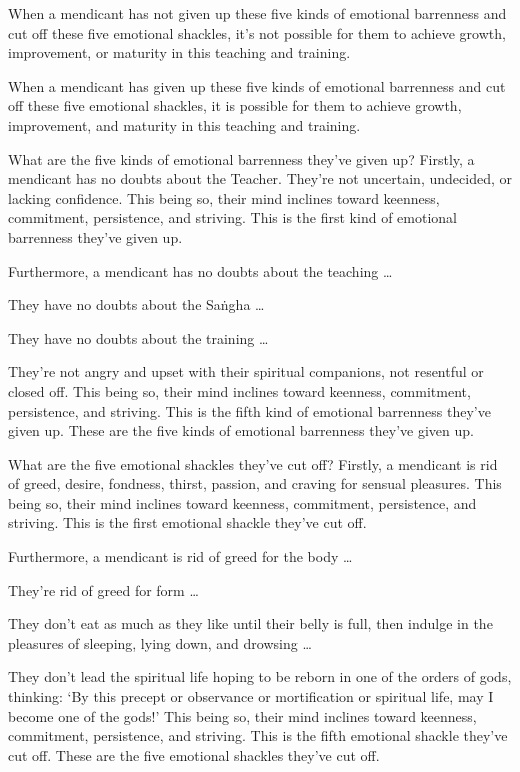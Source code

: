 \documentclass[12pt,openany]{book}%
\begin{document}
When a mendicant has not given up these five kinds of emotional barrenness and cut off these five emotional shackles, it’s not possible for them to achieve growth, improvement, or maturity in this teaching and training. 

When a mendicant has given up these five kinds of emotional barrenness and cut off these five emotional shackles, it is possible for them to achieve growth, improvement, and maturity in this teaching and training. 

What are the five kinds of emotional barrenness they’ve given up? Firstly, a mendicant has no doubts about the Teacher. They’re not uncertain, undecided, or lacking confidence. This being so, their mind inclines toward keenness, commitment, persistence, and striving. This is the first kind of emotional barrenness they’ve given up. 

Furthermore, a mendicant has no doubts about the teaching … 

They have no doubts about the \textsanskrit{Saṅgha} … 

They have no doubts about the training … 

They’re not angry and upset with their spiritual companions, not resentful or closed off. This being so, their mind inclines toward keenness, commitment, persistence, and striving. This is the fifth kind of emotional barrenness they’ve given up. These are the five kinds of emotional barrenness they’ve given up. 

What are the five emotional shackles they’ve cut off? Firstly, a mendicant is rid of greed, desire, fondness, thirst, passion, and craving for sensual pleasures. This being so, their mind inclines toward keenness, commitment, persistence, and striving. This is the first emotional shackle they’ve cut off. 

Furthermore, a mendicant is rid of greed for the body … 

They’re rid of greed for form … 

They don’t eat as much as they like until their belly is full, then indulge in the pleasures of sleeping, lying down, and drowsing … 

They don’t lead the spiritual life hoping to be reborn in one of the orders of gods, thinking: ‘By this precept or observance or mortification or spiritual life, may I become one of the gods!’ This being so, their mind inclines toward keenness, commitment, persistence, and striving. This is the fifth emotional shackle they’ve cut off. These are the five emotional shackles they’ve cut off. 
\end{document}
